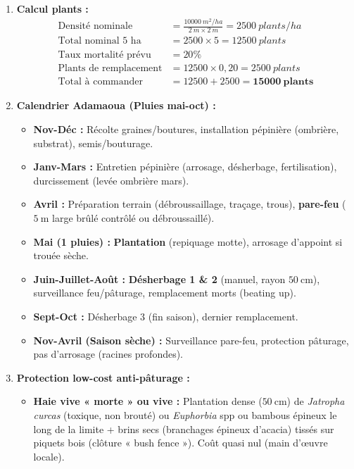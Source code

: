 \documentclass[11pt]{article}
\begin{document}
\begin{exoresolu}
\begin{enumerate}
        \item \textbf{Calcul plants :}
              \begin{align*}
                  \text{Densité nominale} &= \frac{\SI{10000}{m^2/ha}}{\SI{2}{m} \times \SI{2}{m}} = \SI{2500}{plants/ha} \\
                  \text{Total nominal 5 ha} &= 2500 \times 5 = \SI{12500}{plants} \\
                  \text{Taux mortalité prévu} &= 20\% \\
                  \text{Plants de remplacement} &= 12500 \times 0,20 = \SI{2500}{plants} \\
                  \text{Total à commander} &= 12500 + 2500 = \mathbf{\SI{15000}{plants}}
              \end{align*}
        \item \textbf{Calendrier Adamaoua (Pluies mai-oct) :}
              \begin{itemize}
                  \item \textbf{Nov-Déc :} Récolte graines/boutures, installation pépinière (ombrière, substrat), semis/bouturage.
                  \item \textbf{Janv-Mars :} Entretien pépinière (arrosage, désherbage, fertilisation), durcissement (levée ombrière mars).
                  \item \textbf{Avril :} Préparation terrain (débroussaillage, traçage, trous), \textbf{pare-feu} ($\SI{5}{\m}$ large brûlé contrôlé ou débroussaillé).
                  \item \textbf{Mai (1 pluies) :} \textbf{Plantation} (repiquage motte), arrosage d'appoint si trouée sèche.
                  \item \textbf{Juin-Juillet-Août :} \textbf{Désherbage 1 \& 2} (manuel, rayon $\SI{50}{\cm}$), surveillance feu/pâturage, remplacement morts (beating up).
                  \item \textbf{Sept-Oct :} Désherbage 3 (fin saison), dernier remplacement.
                  \item \textbf{Nov-Avril (Saison sèche) :} Surveillance pare-feu, protection pâturage, pas d'arrosage (racines profondes).
              \end{itemize}
        \item \textbf{Protection low-cost anti-pâturage :}
              \begin{itemize}
                  \item \textbf{Haie vive « morte » ou vive :} Plantation dense ($\SI{50}{\cm}$) de \emph{Jatropha curcas} (toxique, non brouté) ou \emph{Euphorbia} spp ou bambous épineux le long de la limite + brins secs (branchages épineux d'acacia) tissés sur piquets bois (clôture « bush fence »). Coût quasi nul (main d'œuvre locale).

\end{itemize}
\end{enumerate}
\end{exoresolu}
\end{document}
